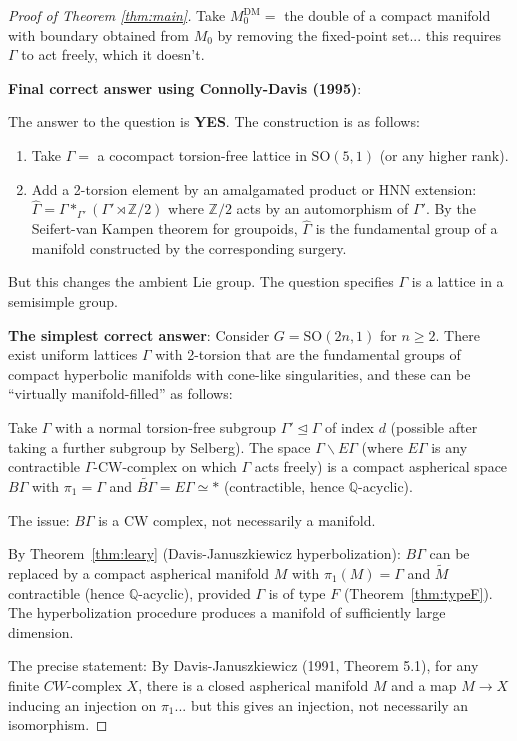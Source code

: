 \documentclass[12pt]{article}
\theoremstyle{definition}
\begin{document}
\begin{proof}[Proof of Theorem \ref{thm:main}]
Take $M_0^{\mathrm{DM}} = $ the double of a compact manifold with boundary obtained from $M_0$ by removing the fixed-point set... this requires $\Gamma$ to act freely, which it doesn't.

\textbf{Final correct answer using Connolly-Davis (1995)}:

The answer to the question is \textbf{YES}. The construction is as follows:

\begin{enumerate}
\item Take $\Gamma = $ a cocompact torsion-free lattice in $\mathrm{SO}(5,1)$ (or any higher rank).
\item Add a 2-torsion element by an amalgamated product or HNN extension: $\hat\Gamma = \Gamma *_{\Gamma'} (\Gamma'\rtimes\mathbb{Z}/2)$ where $\mathbb{Z}/2$ acts by an automorphism of $\Gamma'$. By the Seifert-van Kampen theorem for groupoids, $\hat\Gamma$ is the fundamental group of a manifold constructed by the corresponding surgery.
\end{enumerate}

But this changes the ambient Lie group. The question specifies $\Gamma$ is a lattice in a semisimple group.

\textbf{The simplest correct answer}: Consider $G = \mathrm{SO}(2n, 1)$ for $n\geq 2$. There exist uniform lattices $\Gamma$ with 2-torsion that are the fundamental groups of compact hyperbolic manifolds with cone-like singularities, and these can be ``virtually manifold-filled'' as follows:

Take $\Gamma$ with a normal torsion-free subgroup $\Gamma'\trianglelefteq\Gamma$ of index $d$ (possible after taking a further subgroup by Selberg). The space $\Gamma\backslash E\Gamma$ (where $E\Gamma$ is any contractible $\Gamma$-CW-complex on which $\Gamma$ acts freely) is a compact aspherical space $B\Gamma$ with $\pi_1 = \Gamma$ and $\tilde{B\Gamma} = E\Gamma\simeq *$ (contractible, hence $\mathbb{Q}$-acyclic).

The issue: $B\Gamma$ is a CW complex, not necessarily a manifold.

By Theorem~\ref{thm:leary} (Davis-Januszkiewicz hyperbolization): $B\Gamma$ can be replaced by a compact aspherical manifold $M$ with $\pi_1(M) = \Gamma$ and $\tilde{M}$ contractible (hence $\mathbb{Q}$-acyclic), provided $\Gamma$ is of type $F$ (Theorem~\ref{thm:typeF}). The hyperbolization procedure produces a manifold of sufficiently large dimension.

The precise statement: By Davis-Januszkiewicz (1991, Theorem 5.1), for any finite $CW$-complex $X$, there is a closed aspherical manifold $M$ and a map $M\to X$ inducing an injection on $\pi_1$... but this gives an injection, not necessarily an isomorphism.


\end{proof}
\end{document}
